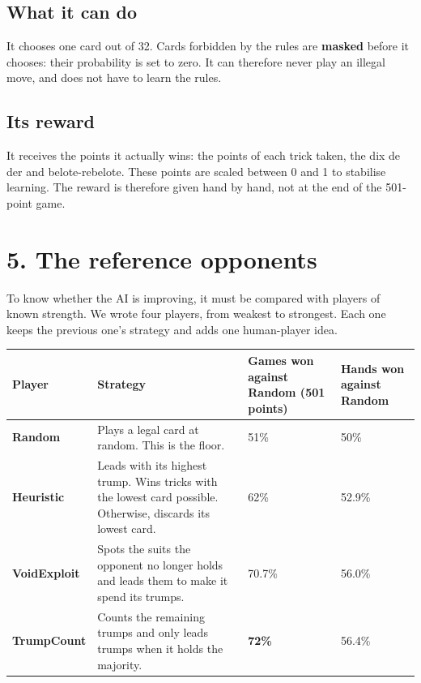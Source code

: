 \subsection*{What it can do}

It chooses one card out of 32. Cards forbidden by the rules are \textbf{masked} before it chooses: their probability is set to zero. It can therefore never play an illegal move, and does not have to learn the rules.

\subsection*{Its reward}

It receives the points it actually wins: the points of each trick taken, the dix de der and belote-rebelote. These points are scaled between 0 and 1 to stabilise learning. The reward is therefore given hand by hand, not at the end of the 501-point game.

\section*{5. The reference opponents}

To know whether the AI is improving, it must be compared with players of known strength. We wrote four players, from weakest to strongest. Each one keeps the previous one's strategy and adds one human-player idea.

\begin{table}[htbp]\centering\small\begin{tabularx}{\linewidth}{lXXl}\toprule

Player & Strategy & Games won against Random (501 points) & Hands won against Random \\\midrule

\textbf{Random} & Plays a legal card at random. This is the floor. & 51\% & 50\% \\

\textbf{Heuristic} & Leads with its highest trump. Wins tricks with the lowest card possible. Otherwise, discards its lowest card. & 62\% & 52.9\% \\

\textbf{VoidExploit} & Spots the suits the opponent no longer holds and leads them to make it spend its trumps. & 70.7\% & 56.0\% \\

\textbf{TrumpCount} & Counts the remaining trumps and only leads trumps when it holds the majority. & \textbf{72\%} & 56.4\% \\

\bottomrule\end{tabularx}\end{table}

